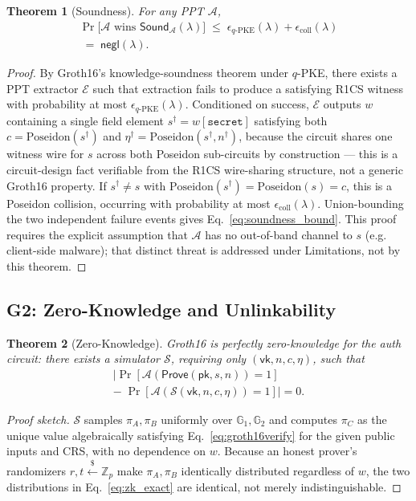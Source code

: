 \documentclass[journal,twoside,10pt]{IEEEtran}
\newtheorem{theorem}{Theorem}
\begin{document}
\begin{theorem}[Soundness]
\label{thm:soundness}
For any PPT $\mathcal{A}$,
\begin{multline}
\Pr\big[\mathcal{A}\text{ wins }\mathsf{Sound}_{\mathcal{A}}(\lambda)\big]
\;\le\; \epsilon_{q\text{-PKE}}(\lambda) + \epsilon_{\mathrm{coll}}(\lambda) \\
\;=\; \mathsf{negl}(\lambda).
\label{eq:soundness_bound}
\end{multline}
\end{theorem}

\begin{proof}
By Groth16's knowledge-soundness theorem under $q$-PKE, there exists a PPT
extractor $\mathcal{E}$ such that extraction fails to produce a satisfying
R1CS witness with probability at most $\epsilon_{q\text{-PKE}}(\lambda)$.
Conditioned on success, $\mathcal{E}$ outputs $w$ containing a single field
element $s^\dagger = w[\mathtt{secret}]$ satisfying both
$c=\mathrm{Poseidon}(s^\dagger)$ and $\eta^\dagger = \mathrm{Poseidon}(s^\dagger, n^\dagger)$,
because the circuit shares one witness wire for $s$ across both Poseidon
sub-circuits by construction --- this is a circuit-design fact verifiable
from the R1CS wire-sharing structure, not a generic Groth16 property. If
$s^\dagger \ne s$ with $\mathrm{Poseidon}(s^\dagger)=\mathrm{Poseidon}(s)=c$,
this is a Poseidon collision, occurring with probability at most
$\epsilon_{\mathrm{coll}}(\lambda)$. Union-bounding the two independent
failure events gives Eq.~\ref{eq:soundness_bound}. This proof requires the
explicit assumption that $\mathcal{A}$ has no out-of-band channel to $s$
(e.g. client-side malware); that distinct threat is addressed under
Limitations, not by this theorem.
\end{proof}

\subsection{G2: Zero-Knowledge and Unlinkability}
\begin{theorem}[Zero-Knowledge]
\label{thm:zk}
Groth16 is \emph{perfectly} zero-knowledge for the auth circuit: there
exists a simulator $\mathcal{S}$, requiring only $(\mathsf{vk}, n, c, \eta)$,
such that
\begin{multline}
\Big|\Pr[\mathcal{A}(\mathsf{Prove}(\mathsf{pk},s,n))=1] \\
-\;\Pr[\mathcal{A}(\mathcal{S}(\mathsf{vk},n,c,\eta))=1]\Big| = 0.
\label{eq:zk_exact}
\end{multline}
\end{theorem}
\begin{proof}[Proof sketch]
$\mathcal{S}$ samples $\pi_A,\pi_B$ uniformly over $\mathbb{G}_1,\mathbb{G}_2$
and computes $\pi_C$ as the unique value algebraically satisfying
Eq.~\ref{eq:groth16verify} for the given public inputs and CRS, with no
dependence on $w$. Because an honest prover's randomizers $r,t\xleftarrow{\$}\mathbb{Z}_p$
make $\pi_A,\pi_B$ identically distributed regardless of $w$, the two
distributions in Eq.~\ref{eq:zk_exact} are identical, not merely
indistinguishable.
\end{proof}
\end{document}
